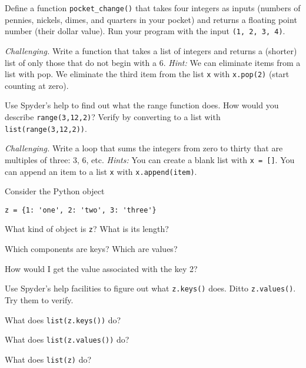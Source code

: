 \documentclass[11pt]{exam}
\begin{document}
\begin{questions}

\item Define a function \verb|pocket_change()| that takes four integers as inputs
(numbers of pennies, nickels, dimes, and quarters in your pocket)
and returns a floating point number (their dollar value).
Run your program with the input {\tt (1, 2, 3, 4)}.

\item {\it Challenging.\/}
Write a function that takes a list of integers
and returns a (shorter) list of only those that do not begin with a 6.
{\it Hint:} We can eliminate items from a list with pop.
We eliminate the third item from the list {\tt x}
with {\tt x.pop(2)} (start counting at zero).


\item Use Spyder's help to find out what the range function does.
How would you describe {\tt range(3,12,2)}?
Verify by converting to a list with {\tt list(range(3,12,2))}.

\item {\it Challenging.\/}
Write a loop that sums the integers from zero to thirty that are multiples of three:
3, 6, etc.
{\it Hints:}  You can create a blank list with {\tt x = []}.
You can append an item to a list {\tt x} with {\tt x.append(item)}.

\item Consider the Python object
\begin{verbatim}
z = {1: 'one', 2: 'two', 3: 'three'}
\end{verbatim}
\begin{parts}
\item What kind of object is {\tt z}?  What is its length?
\item Which components are keys?  Which are values?
\item How would I get the value associated with the key 2?
\item Use Spyder's help facilities to figure out what {\tt z.keys()} does.
Ditto {\tt z.values()}.  Try them to verify.
\item What does {\tt list(z.keys())} do?
\item What does {\tt list(z.values())} do?
\item What does {\tt list(z)} do?
\end{parts}



\end{questions}
\end{document}

